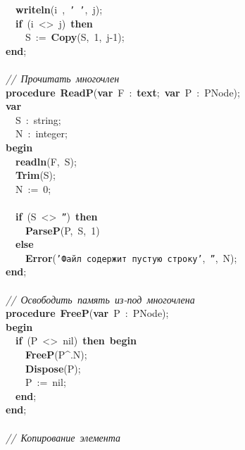 \mbox{}\ \ \textbf{writeln}(i\ ,\ \texttt{'\ '},\ j); \\
\mbox{}\ \ \textbf{if}\ (i\ \textless{}\textgreater{}\ j)\ \textbf{then} \\
\mbox{}\ \ \ \ S\ :=\ \textbf{Copy}(S,\ 1,\ j-1); \\
\mbox{}\textbf{end}; \\
\mbox{} \\
\mbox{}\textit{//\ Прочитать\ многочлен} \\
\mbox{}\textbf{procedure}\ \textbf{ReadP}(\textbf{var}\ F\ :\ \textbf{text};\ \textbf{var}\ P\ :\ PNode); \\
\mbox{}\textbf{var} \\
\mbox{}\ \ S\ :\ string; \\
\mbox{}\ \ N\ :\ integer; \\
\mbox{}\textbf{begin} \\
\mbox{}\ \ \textbf{readln}(F,\ S); \\
\mbox{}\ \ \textbf{Trim}(S); \\
\mbox{}\ \ N\ :=\ 0; \\
\mbox{} \\
\mbox{}\ \ \textbf{if}\ (S\ \textless{}\textgreater{}\ \texttt{''})\ \textbf{then} \\
\mbox{}\ \ \ \ \textbf{ParseP}(P,\ S,\ 1) \\
\mbox{}\ \ \textbf{else} \\
\mbox{}\ \ \ \ \textbf{Error}(\texttt{'Файл\ содержит\ пустую\ строку'},\ \texttt{''},\ N); \\
\mbox{}\textbf{end}; \\
\mbox{} \\
\mbox{}\textit{//\ Освободить\ память\ из-под\ многочлена} \\
\mbox{}\textbf{procedure}\ \textbf{FreeP}(\textbf{var}\ P\ :\ PNode); \\
\mbox{}\textbf{begin} \\
\mbox{}\ \ \textbf{if}\ (P\ \textless{}\textgreater{}\ nil)\ \textbf{then}\ \textbf{begin} \\
\mbox{}\ \ \ \ \textbf{FreeP}(P\textasciicircum{}.N); \\
\mbox{}\ \ \ \ \textbf{Dispose}(P); \\
\mbox{}\ \ \ \ P\ :=\ nil; \\
\mbox{}\ \ \textbf{end}; \\
\mbox{}\textbf{end}; \\
\mbox{} \\
\mbox{}\textit{//\ Копирование\ элемента} \\
